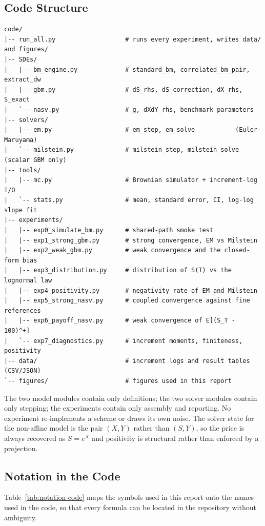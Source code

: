 \documentclass[11pt,a4paper]{article}
\theoremstyle{definition}
\theoremstyle{remark}
\begin{document}
\subsection{Code Structure}
\label{sec:code-structure}

\begin{verbatim}
code/
|-- run_all.py                   # runs every experiment, writes data/ and figures/
|-- SDEs/
|   |-- bm_engine.py             # standard_bm, correlated_bm_pair, extract_dw
|   |-- gbm.py                   # dS_rhs, dS_correction, dX_rhs, S_exact
|   `-- nasv.py                  # g, dXdY_rhs, benchmark parameters
|-- solvers/
|   |-- em.py                    # em_step, em_solve           (Euler-Maruyama)
|   `-- milstein.py              # milstein_step, milstein_solve (scalar GBM only)
|-- tools/
|   |-- mc.py                    # Brownian simulator + increment-log I/O
|   `-- stats.py                 # mean, standard error, CI, log-log slope fit
|-- experiments/
|   |-- exp0_simulate_bm.py      # shared-path smoke test
|   |-- exp1_strong_gbm.py       # strong convergence, EM vs Milstein
|   |-- exp2_weak_gbm.py         # weak convergence and the closed-form bias
|   |-- exp3_distribution.py     # distribution of S(T) vs the lognormal law
|   |-- exp4_positivity.py       # negativity rate of EM and Milstein
|   |-- exp5_strong_nasv.py      # coupled convergence against fine references
|   |-- exp6_payoff_nasv.py      # weak convergence of E[(S_T - 100)^+]
|   `-- exp7_diagnostics.py      # increment moments, finiteness, positivity
|-- data/                        # increment logs and result tables (CSV/JSON)
`-- figures/                     # figures used in this report
\end{verbatim}

The two model modules contain only definitions; the two solver modules contain
only stepping; the experiments contain only assembly and reporting. No
experiment re-implements a scheme or draws its own noise. The solver state for
the non-affine model is the pair $(X, Y)$ rather than $(S, Y)$, so the price is
always recovered as $S = e^{X}$ and positivity is structural rather than
enforced by a projection.

\subsection{Notation in the Code}
\label{sec:notation-code}

Table~\ref{tab:notation-code} maps the symbols used in this report onto the
names used in the code, so that every formula can be located in the repository
without ambiguity.
\end{document}
